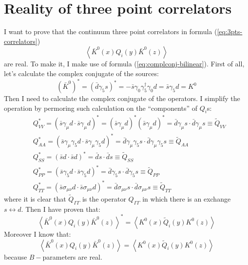 \documentclass[english, LaM, oneside, noexaminfo]{sapthesis}
\newcommand{\la}{\langle}
\newcommand{\ra}{\rangle}
\begin{document}
\section{Reality of three point correlators}\label{app:proof-reality-3pts}
\noindent
I want to prove that the continuum three point correlators in formula (\ref{eq:3pts-correlators})
$$ \left\la \bar K^0 (x) Q_i (y) \bar K^0 (z) \right\ra $$
are real. To make it, I make use of formula (\ref{eq:complconj-bilinear}).
First of all, let's calculate the complex conjugate of the sources: 
\begin{equation*}
    (\bar K^{0})^* = (\bar d \gamma_5 s)^* = - \bar s \gamma_0 \gamma_5^\dagger \gamma_0 d = \bar s  \gamma_5 d = K^0
\end{equation*}
Then I need to calculate the complex conjugate of the operators.
I simplify the operation by permoring such calculation on the ``components'' of $Q_i$s:
\begin{equation*}
    \begin{aligned}
        & Q_{VV}^* = \left(\bar s \gamma_\mu d \cdot \bar s \gamma_\mu d\right)^* = \left(\bar s \gamma_\mu d\right)^* \left(\bar s \gamma_\mu d\right)^* = \bar d \gamma_\mu s \cdot \bar d \gamma_\mu s \equiv \tilde{Q}_{VV} \\
        & Q_{AA}^* = \left(\bar s \gamma_\mu \gamma_5 d \cdot \bar s \gamma_\mu \gamma_5 d\right)^* = \bar d \gamma_\mu\gamma_5 s \cdot \bar d \gamma_\mu\gamma_5 s \equiv \tilde{Q}_{AA} \\
        & Q_{SS}^* = \left(\bar s  d \cdot \bar s d\right)^* = \bar d  s \cdot \bar d s \equiv \tilde{Q}_{SS} \\
        & Q_{PP}^* = \left(\bar s \gamma_5 d \cdot \bar s \gamma_5 d\right)^* = \bar d \gamma_5 s \cdot \bar d \gamma_5 s \equiv \tilde{Q}_{PP} \\
        & Q_{TT}^* = \left(\bar s \sigma_{\mu\nu} d \cdot \bar s \sigma_{\mu\nu} d\right)^* = \bar d \sigma_{\mu\nu} s \cdot \bar d \sigma_{\mu\nu} s \equiv \tilde{Q}_{TT}
    \end{aligned}
\end{equation*}
where it is clear that $\tilde Q_{\Gamma\Gamma}$ is the operator $Q_{\Gamma\Gamma}$ in which there is an exchange $s \leftrightarrow d$.
Then I have proven that:
$$ \left\la \bar K^0 (x) Q_i (y) \bar K^0 (z) \right\ra^* = \left\la  K^0 (x) \tilde{Q}_i (y) K^0 (z) \right\ra $$
Moreover I know that:
$$ \left\la \bar K^0 (x) Q_i (y) \bar K^0 (z) \right\ra = \left\la  K^0 (x) \tilde{Q}_i (y) K^0 (z) \right\ra $$
because $B-$parameters are real.
\end{document}
